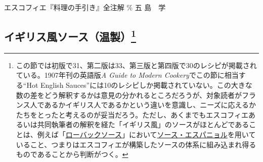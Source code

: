 エスコフィエ『料理の手引き』全注解 \% 五 島　学

\href{未、原文対照チェック}{} \href{未、日本語表現校正}{}
\href{未、その他修正}{} \href{未、原稿最終校正}{}

\begin{Main}

\hypertarget{ux30a4ux30aeux30eaux30b9ux98a8ux30bdux30fcux30b9ux6e29ux88fd24}{%
\section[イギリス風ソース（温製）]{\texorpdfstring{イギリス風ソース（温製）\footnote{この節では初版で31、第二版は33、第三版と第四版で30のレシピが掲載されている。1907年刊の英語版\emph{A
  Guide to Modern Cookery}でこの節に相当する``Hot English
  Sauces''には10のレシピしか掲載されていない。この大きな数の差をどう解釈するかは意見の分かれるところだろうが、対象読者がフランス人であるかイギリス人であるかという違いを意識し、ニーズに応えるかたちをとったと考えるのが妥当だろう。ただし、あくまでもエスコフィエあるいは共同執筆者の解釈を経た「イギリス風」のソースがほとんどであることは、例えば「\protect\hyperlink{roe-buck-sauce}{ローバックソース}」において\protect\hyperlink{sauce-espagnole}{ソース・エスパニョル}を用いていること、つまりはエスコフィエが構築したソースの体系に組み込まれ得るものであることから判断がつく。}}{イギリス風ソース（温製）}}\label{ux30a4ux30aeux30eaux30b9ux98a8ux30bdux30fcux30b9ux6e29ux88fd24}}



\end{Main}

